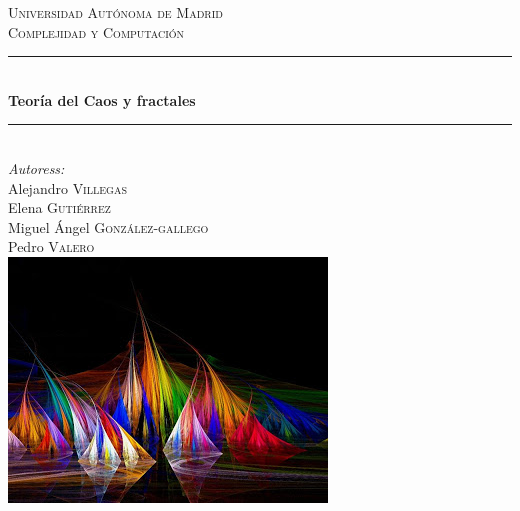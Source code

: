 \renewcommand{\headrulewidth}{0.5pt}




\begin{titlepage}

\newcommand{\HRule}{\rule{\linewidth}{0.5mm}} %

\center %


\textsc{\LARGE Universidad Autónoma de Madrid}\\[1.5cm] %
\textsc{\Large Complejidad y Computación}\\[0.5cm] %



\HRule \\[0.4cm]
{ \huge \bfseries Teoría del Caos y fractales}\\[0.4cm] %
\HRule \\[1cm]




\Large \emph{Autoress:}\\
Alejandro \textsc{Villegas}\\ %
Elena \textsc{Gutiérrez}\\ %
Miguel Ángel \textsc{González-gallego} \\
Pedro \textsc{Valero}\\[1cm] %


\includegraphics{img/Logo.jpg}\\ %


\end{titlepage}
